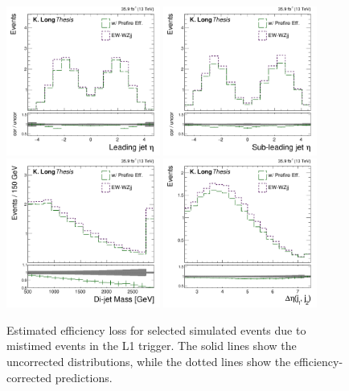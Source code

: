 \begin{figure}[htbp]
  \centering
   \includegraphics[width=0.45\textwidth]{figures/AnalysisProcedure/jet0Eta_prefiring.pdf}
   \includegraphics[width=0.45\textwidth]{figures/AnalysisProcedure/jet1Eta_prefiring.pdf}
   \includegraphics[width=0.45\textwidth]{figures/AnalysisProcedure/mjj_prefiring.pdf}
   \includegraphics[width=0.45\textwidth]{figures/AnalysisProcedure/dEtajj_prefiring.pdf}
  \caption[Estimated efficiency loss for selected \EWWZ simulated events due to 
      mistimed events in the L1 trigger]{
      Estimated efficiency loss for selected \EWWZ simulated events due to 
      mistimed events in the L1 trigger. The solid lines show the uncorrected
      distributions, while the dotted lines show the efficiency-corrected 
      predictions.
        }
 \label{fig:signalPrefiringEff}
\end{figure}

